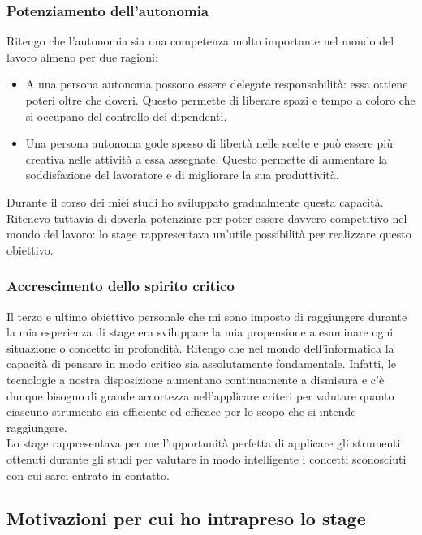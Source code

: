 			\subsubsection{Potenziamento dell'autonomia}
				Ritengo che l'autonomia sia una competenza molto importante nel mondo del lavoro almeno per due ragioni:
				\begin{itemize}
					\item A una persona autonoma possono essere delegate responsabilità: essa ottiene poteri oltre che doveri.
					Questo permette di liberare spazi e tempo a coloro che si occupano del controllo dei dipendenti.
					\item Una persona autonoma gode spesso di libertà nelle scelte e può essere più creativa nelle attività a
					essa assegnate. Questo permette di aumentare la soddisfazione del lavoratore e di migliorare la sua
					produttività. 
				\end{itemize}
				Durante il corso dei miei studi ho sviluppato gradualmente questa capacità. Ritenevo tuttavia di doverla potenziare
				per poter essere davvero competitivo nel mondo del lavoro: lo stage rappresentava un'utile possibilità per realizzare
				questo obiettivo.
			\subsubsection{Accrescimento dello spirito critico}
				Il terzo e ultimo obiettivo personale che mi sono imposto di raggiungere durante la mia esperienza di stage era
				sviluppare la mia propensione a esaminare ogni situazione o concetto in profondità. Ritengo che nel mondo
				dell'informatica la capacità di pensare in modo critico sia assolutamente fondamentale. Infatti, le tecnologie a
				nostra disposizione aumentano continuamente a dismisura e c'è dunque bisogno di grande accortezza nell'applicare
				criteri per valutare quanto ciascuno strumento sia efficiente ed efficace per lo scopo che si intende raggiungere.\\
				Lo stage rappresentava per me l'opportunità perfetta di applicare gli strumenti ottenuti durante gli studi per
				valutare in modo intelligente i concetti sconosciuti con cui sarei entrato in contatto.
		\subsection{Motivazioni per cui ho intrapreso lo stage}
